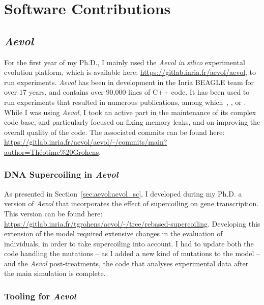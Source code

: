 \chapter{Software Contributions}
\label{chap:software}

\section{\emph{Aevol}}

For the first year of my Ph.D., I mainly used the \emph{Aevol} \emph{in silico} experimental evolution platform, which is available here: \url{https://gitlab.inria.fr/aevol/aevol}, to run experiments.
\emph{Aevol} has been in development in the Inria BEAGLE team for over 17 years, and contains over 90,000 lines of C++ code.
It has been used to run experiments that resulted in numerous publications, among which~\cite{knibbe2005}, \cite{batut2013}, or \cite{rutten2019}.
While I was using \emph{Aevol}, I took an active part in the maintenance of its complex code base, and particularly focused on fixing memory leaks, and on improving the overall quality of the code.
The associated commits can be found here: \url{https://gitlab.inria.fr/aevol/aevol/-/commits/main?author=Théotime%20Grohens}.

\subsection{DNA Supercoiling in \emph{Aevol}}

As presented in Section~\ref{sec:aevol:aevol_sc}, I developed during my Ph.D. a version of \emph{Aevol} that incorporates the effect of supercoiling on gene transcription.
This version can be found here: \url{https://gitlab.inria.fr/tgrohens/aevol/-/tree/rebased-supercoiling}.
Developing this extension of the model required extensive changes in the evaluation of individuals, in order to take supercoiling into account.
I had to update both the code handling the mutations -- as I added a new kind of mutations to the model -- and the \emph{Aevol} post-treatments, the code that analyses experimental data after the main simulation is complete.

\subsection{Tooling for \emph{Aevol}}

